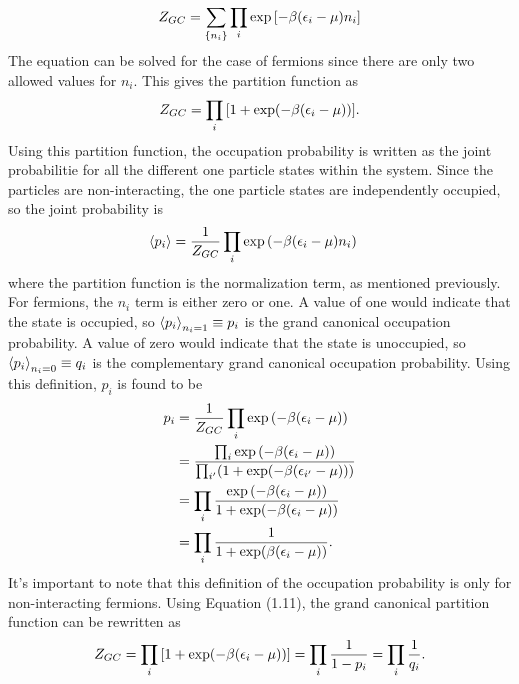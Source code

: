\begin{equation}
    Z_{GC}=\sum_{\{n_i\}} \prod_i \exp\qty[-\beta\qty(\epsilon_i-\mu)n_i]
\end{equation}
The equation can be solved for the case of fermions since there are only two allowed values for $n_{i}$. This gives the partition function as 
\begin{equation}
    Z_{GC}=\prod_{i}\qty[1+\exp(-\beta\qty(\epsilon_i-\mu))].
\end{equation}
Using this partition function, the occupation probability is written as the joint probabilitie for all the different one particle states within the system. Since the particles are non-interacting, the one particle states are independently occupied, so the joint probability is 
\begin{align}
    \left<{p_i}\right>&=\frac{1}{Z_{GC}} \prod_i \exp\qty(-\beta\qty(\epsilon_i-\mu)n_i)
\end{align}
where the partition function is the normalization term, as mentioned previously. For fermions, the $n_i$ term is either zero or one. A value of one would indicate that the state is occupied, so $\left<{p_i}\right>_{n_i=1}\equiv p_i$ is the grand canonical occupation probability. A value of zero would indicate that the state is unoccupied, so $\left<{p_i}\right>_{n_i=0}\equiv q_i$ is the complementary grand canonical occupation probability. Using this definition, $p_i$ is found to be 
\begin{align}
    p_i &=\frac{1}{Z_{GC}}\prod_i \exp\qty(-\beta\qty(\epsilon_i-\mu))\nonumber\\
    &=\frac{\prod_i \exp\qty(-\beta\qty(\epsilon_i-\mu))}{\prod_{i'}(1+\exp(-\beta\qty(\epsilon_{i'}-\mu)))}\nonumber\\
    &=\prod_i \frac{\exp\qty(-\beta\qty(\epsilon_i-\mu))}{1+\exp(-\beta\qty(\epsilon_i-\mu))}\nonumber\\
    &=\prod_i\frac{1}{1+\exp(\beta(\epsilon_i-\mu))}.
\end{align}
It's important to note that this definition of the occupation probability is only for non-interacting fermions. Using Equation (1.11), the grand canonical partition function can be rewritten as 
\begin{equation}
    Z_{GC}=\prod_{i}\qty[1+\exp(-\beta\qty(\epsilon_i-\mu))]=\prod_i\frac{1}{1-p_i}=\prod_i \frac{1}{q_i}.
\end{equation}
